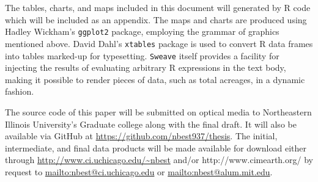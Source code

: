 The tables, charts, and maps included in this document will generated
by R code which will be included as an appendix.  The maps and charts
are produced using Hadley Wickham's \citeyearpar{Wickham2009}
\texttt{ggplot2} package, employing the grammar of graphics mentioned
above.  David Dahl's \texttt{xtables} package is used to convert R
data frames into tables marked-up for typesetting.  \texttt{Sweave}
itself provides a facility for injecting the results of evaluating
arbitrary R expressions in the text body, making it possible to render
pieces of data, such as total acreages, in a dynamic fashion.

The source code of this paper will be submitted on optical media to
Northeastern Illinois University's Graduate college along with the
final draft.  It will also be available via GitHub at
\url{https://github.com/nbest937/thesis}.  The initial, intermediate,
and final data products will be made available for download either
through \url{http://www.ci.uchicago.edu/~nbest} and\slash or
{http://www.cimearth.org/} by request to
\url{mailto:nbest@ci.uchicago.edu} or \url{mailto:nbest@alum.mit.edu}.



